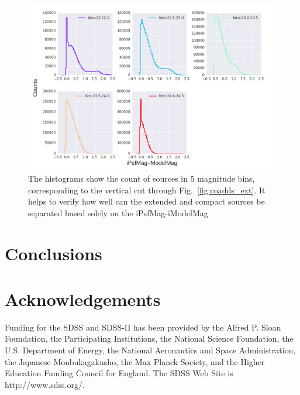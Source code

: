 \documentclass[fleqn,usenatbib]{mnras}  %
\begin{document}
\begin{figure}
\label{fig:coadds_ext_hist}
 \includegraphics[width=\textwidth]{Extendedness_coadd_histograms.png}
 \caption{The histograms show the count of sources in 5 magnitude bins, corresponding to the vertical cut through Fig.~\ref{fig:coadds_ext}. It helps to verify how well can the extended and compact sources be separated based solely on the iPsfMag-iModelMag}
\end{figure}






\section{Conclusions}
\label{sec:conclusions}



\section*{Acknowledgements}

Funding for the SDSS and SDSS-II has been provided by the Alfred P. Sloan Foundation, the Participating Institutions, the National Science Foundation, the U.S. Department of Energy, the National Aeronautics and Space Administration, the Japanese Monbukagakusho, the Max Planck Society, and the Higher Education Funding Council for England. The SDSS Web Site is http://www.sdss.org/.
\end{document}
